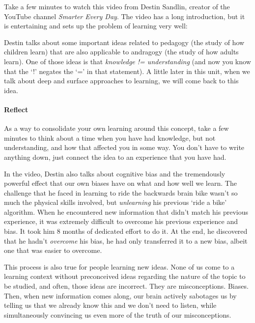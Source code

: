 \documentclass[
]{book}
\begin{document}
Take a few minutes to watch this video from Destin Sandlin, creator of the YouTube channel \emph{Smarter Every Day}. The video has a long introduction, but it is entertaining and sets up the problem of learning very well:

Destin talks about some important ideas related to pedagogy (the study of how children learn) that are also applicable to andragogy (the study of how adults learn). One of those ideas is that \emph{knowledge != understanding} (and now you know that the `!' negates the `=' in that statement). A little later in this unit, when we talk about deep and surface approaches to learning, we will come back to this idea.

\begin{reflect}
\hypertarget{reflect}{%
\paragraph{Reflect}\label{reflect}}

As a way to consolidate your own learning around this concept, take a
few minutes to think about a time when you have had knowledge, but not
understanding, and how that affected you in some way. You don't have to
write anything down, just connect the idea to an experience that you
have had.
\end{reflect}

In the video, Destin also talks about cognitive bias and the tremendously powerful effect that our own biases have on what and how well we learn. The challenge that he faced in learning to ride the backwards brain bike wasn't so much the physical skills involved, but \emph{unlearning} his previous `ride a bike' algorithm. When he encountered new information that didn't match his previous experience, it was extremely difficult to overcome his previous experience and bias. It took him 8 months of dedicated effort to do it. At the end, he discovered that he hadn't \emph{overcome} his bias, he had only transferred it to a new bias, albeit one that was easier to overcome.

This process is also true for people learning new ideas. None of us come to a learning context without preconceived ideas regarding the nature of the topic to be studied, and often, those ideas are incorrect. They are misconceptions. Biases. Then, when new information comes along, our brain actively sabotages us by telling us that we already know this and we don't need to listen, while simultaneously convincing us even more of the truth of our misconceptions.
\end{document}
